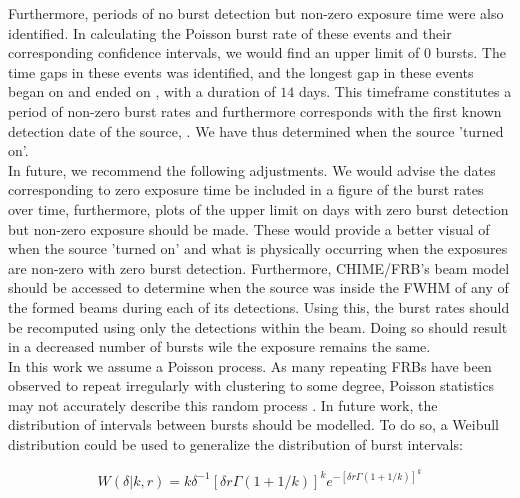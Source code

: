 \documentclass[twocolumn]{aastex631}
\begin{document}
\indent Furthermore, periods of no burst detection but non-zero exposure time were also identified. In calculating the Poisson burst rate of these events and their corresponding confidence intervals, we would find an upper limit of $0$ bursts. The time gaps in these events was identified, and the longest gap in these events began on  and ended on , with a duration of $14$ days. This timeframe constitutes a period of non-zero burst rates and furthermore corresponds with the first known detection date of the source, . We have thus determined when the source 'turned on'.\\
\indent In future, we recommend the following adjustments. We would advise the dates corresponding to zero exposure time be included in a figure of the burst rates over time, furthermore, plots of the upper limit on days with zero burst detection but non-zero exposure should be made. These would provide a better visual of when the source 'turned on' and what is physically occurring when the exposures are non-zero with zero burst detection. Furthermore, CHIME/FRB's beam model should be accessed to determine when the source was inside the FWHM of any of the formed beams during each of its detections. Using this, the burst rates should be recomputed using only the detections within the beam. Doing so should result in a decreased number of bursts wile the exposure remains the same.\\
\indent In this work we assume a Poisson process. As many repeating FRBs have been observed to repeat irregularly with clustering to some degree, Poisson statistics may not accurately describe this random process \citep{oppermann2018non}. In future work, the distribution of intervals between bursts should be modelled. To do so, a Weibull distribution could be used to generalize the distribution of burst intervals:

\begin{equation}
W(\delta |k, r) = k\delta^{-1}[\delta r \Gamma(1+1/k)]^{k}e^{-[\delta r \Gamma(1+1/k)]^{k}}
\end{equation}
\end{document}
